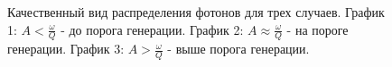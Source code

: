 \begin{figure}
\centering



\caption{Качественный вид распределения фотонов для трех случаев. 
  График 1: $A < \frac{\omega}{Q}$ - до порога генерации.
  График 2: $A \approx \frac{\omega}{Q}$ - на пороге генерации.
  График 3: $A > \frac{\omega}{Q}$ - выше порога генерации.}
\label{figPart2Ch1_3}
\end{figure}
